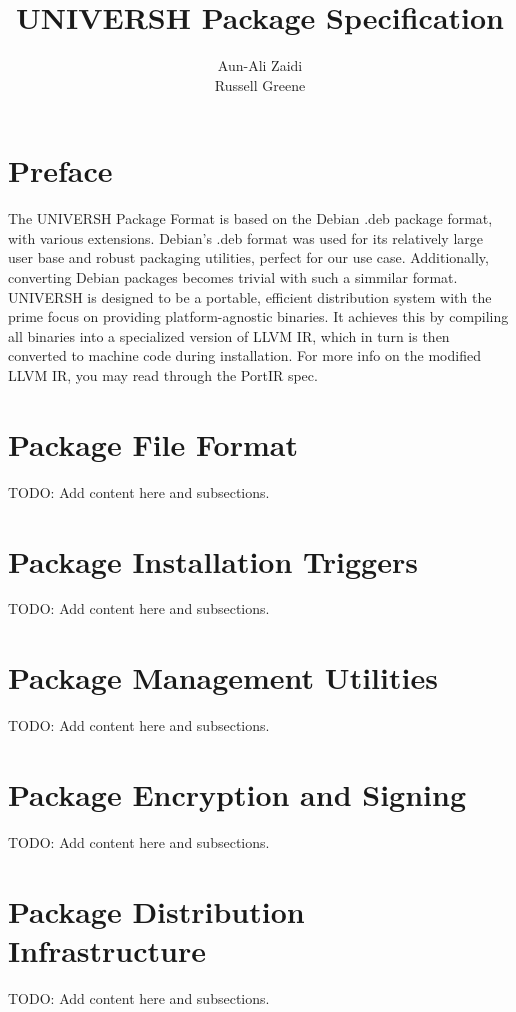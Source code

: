 \documentclass[llpt]{article}
\title{\textbf{UNIVERSH Package Specification}}
\author{Aun-Ali Zaidi\\
        Russell Greene}
\date{}
\begin{document}
\maketitle

\newpage

\tableofcontents

\newpage

\section {Preface}

The UNIVERSH Package Format is based on the Debian .deb package format, with various extensions. Debian's .deb format was used for its
relatively large user base and robust packaging utilities, perfect for our use case. Additionally, converting Debian packages becomes
trivial with such a simmilar format.
\newline
\newline
UNIVERSH is designed to be a portable, efficient distribution system with the prime focus on providing platform-agnostic
binaries. It achieves this by compiling all binaries into a specialized version of LLVM IR, which in turn is then converted to machine code during
installation. For more info on the modified LLVM IR, you may read through the PortIR spec.

\section {Package File Format}

TODO: Add content here and subsections.

\section {Package Installation Triggers}

TODO: Add content here and subsections.

\section {Package Management Utilities}

TODO: Add content here and subsections.

\section {Package Encryption and Signing}

TODO: Add content here and subsections.

\section {Package Distribution Infrastructure}

TODO: Add content here and subsections.
\end{document}
